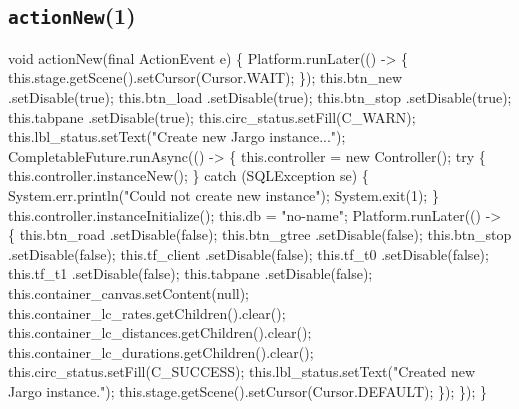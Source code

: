 \subsection{\texttt{actionNew}(1)}
\nwenddocs{}\endmoddef{}
void actionNew(final ActionEvent e) \{
  Platform.runLater(() -> \{
    this.stage.getScene().setCursor(Cursor.WAIT);
  \});
  this.btn_new      .setDisable(true);
  this.btn_load     .setDisable(true);
  this.btn_stop     .setDisable(true);
  this.tabpane      .setDisable(true);
  this.circ_status.setFill(C_WARN);
  this.lbl_status.setText("Create new Jargo instance...");
  CompletableFuture.runAsync(() -> \{
    this.controller = new Controller();
    try \{
      this.controller.instanceNew();
    \} catch (SQLException se) \{
      System.err.println("Could not create new instance");
      System.exit(1);
    \}
    this.controller.instanceInitialize();
    this.db = "no-name";
    Platform.runLater(() -> \{
      this.btn_road     .setDisable(false);
      this.btn_gtree    .setDisable(false);
      this.btn_stop     .setDisable(false);
      this.tf_client    .setDisable(false);
      this.tf_t0        .setDisable(false);
      this.tf_t1        .setDisable(false);
      this.tabpane      .setDisable(false);
      this.container_canvas.setContent(null);
      this.container_lc_rates.getChildren().clear();
      this.container_lc_distances.getChildren().clear();
      this.container_lc_durations.getChildren().clear();
      this.circ_status.setFill(C_SUCCESS);
      this.lbl_status.setText("Created new Jargo instance.");
      this.stage.getScene().setCursor(Cursor.DEFAULT);
    \});
  \});
\}
\eatline
{}\nwendcode{}\nwdocspar
